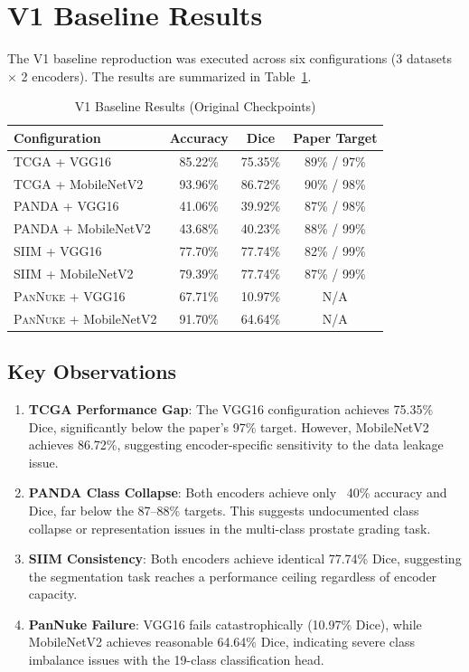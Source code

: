 \documentclass[11pt,a4paper,twoside]{report}
\newcommand{\dataset}[1]{\textsc{#1}}
\newcommand{\tabref}[1]{Table~\ref{#1}}
\begin{document}
\section{V1 Baseline Results}

The V1 baseline reproduction was executed across six configurations (3 datasets $\times$ 2 encoders). The results are summarized in \tabref{tab:v1_results}.

\begin{table}[htbp]
\centering
\caption{V1 Baseline Results (Original Checkpoints)}
\label{tab:v1_results}
\begin{tabular}{lccc}
\toprule
\textbf{Configuration} & \textbf{Accuracy} & \textbf{Dice} & \textbf{Paper Target} \\
\midrule
\dataset{TCGA} + VGG16 & 85.22\% & 75.35\% & 89\% / 97\% \\
\dataset{TCGA} + MobileNetV2 & 93.96\% & 86.72\% & 90\% / 98\% \\
\dataset{PANDA} + VGG16 & 41.06\% & 39.92\% & 87\% / 98\% \\
\dataset{PANDA} + MobileNetV2 & 43.68\% & 40.23\% & 88\% / 99\% \\
\dataset{SIIM} + VGG16 & 77.70\% & 77.74\% & 82\% / 99\% \\
\dataset{SIIM} + MobileNetV2 & 79.39\% & 77.74\% & 87\% / 99\% \\
\midrule
\dataset{PanNuke} + VGG16 & 67.71\% & 10.97\% & N/A \\
\dataset{PanNuke} + MobileNetV2 & 91.70\% & 64.64\% & N/A \\
\bottomrule
\end{tabular}
\end{table}

\subsection{Key Observations}

\begin{enumerate}
    \item \textbf{TCGA Performance Gap}: The VGG16 configuration achieves 75.35\% Dice, significantly below the paper's 97\% target. However, MobileNetV2 achieves 86.72\%, suggesting encoder-specific sensitivity to the data leakage issue.
    
    \item \textbf{PANDA Class Collapse}: Both encoders achieve only ~40\% accuracy and Dice, far below the 87--88\% targets. This suggests undocumented class collapse or representation issues in the multi-class prostate grading task.
    
    \item \textbf{SIIM Consistency}: Both encoders achieve identical 77.74\% Dice, suggesting the segmentation task reaches a performance ceiling regardless of encoder capacity.
    
    \item \textbf{PanNuke Failure}: VGG16 fails catastrophically (10.97\% Dice), while MobileNetV2 achieves reasonable 64.64\% Dice, indicating severe class imbalance issues with the 19-class classification head.
\end{enumerate}
\end{document}
